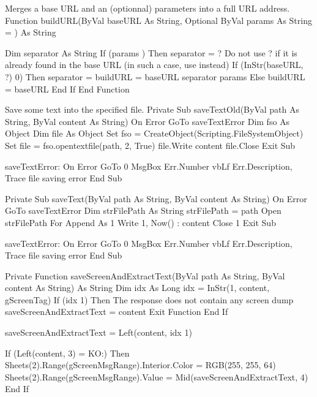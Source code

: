 \documentclass[letterpaper,10pt,english]{sphinxmanual}
\begin{document}
\begin{sphinxVerbatim}[commandchars=\\\{\}]
\PYGZsq{} Merges a base URL and an (optionnal) parameters into a full URL address.
\PYGZsq{}
Function buildURL(ByVal baseURL As String, Optional ByVal params As String = \PYGZdq{}\PYGZdq{}) As String

      Dim separator As String
      If (params \PYGZlt{}\PYGZgt{} \PYGZdq{}\PYGZdq{}) Then
            separator = \PYGZdq{}?\PYGZdq{}
      \PYGZsq{} Do not use \PYGZsq{}?\PYGZsq{} if it is already found in the base URL (in such a case, use \PYGZsq{}\PYGZam{}\PYGZsq{} instead)
      If (InStr(baseURL, \PYGZdq{}?\PYGZdq{}) \PYGZgt{} 0) Then separator = \PYGZdq{}\PYGZam{}\PYGZdq{}
            buildURL = baseURL \PYGZam{} separator \PYGZam{} params
      Else
            buildURL = baseURL
      End If
End Function

\PYGZsq{} Save some text into the specified file.
\PYGZsq{}
Private Sub saveTextOld(ByVal path As String, ByVal content As String)
      On Error GoTo saveTextError
      Dim fso As Object
      Dim file As Object
      Set fso = CreateObject(\PYGZdq{}Scripting.FileSystemObject\PYGZdq{})
      Set file = fso.opentextfile(path, 2, True)
      file.Write content
      file.Close
      Exit Sub

saveTextError:
      On Error GoTo 0
      MsgBox Err.Number \PYGZam{} vbLf \PYGZam{} Err.Description, \PYGZdq{}Trace file saving error\PYGZdq{}
End Sub

Private Sub saveText(ByVal path As String, ByVal content As String)
      On Error GoTo saveTextError
      Dim strFile\PYGZus{}Path As String
      strFile\PYGZus{}Path = path
      Open strFile\PYGZus{}Path For Append As \PYGZsh{}1
      Write \PYGZsh{}1, Now() \PYGZam{} \PYGZdq{} : \PYGZdq{} \PYGZam{} content
      Close \PYGZsh{}1
Exit Sub

saveTextError:
      On Error GoTo 0
      MsgBox Err.Number \PYGZam{} vbLf \PYGZam{} Err.Description, \PYGZdq{}Trace file saving error\PYGZdq{}
End Sub

Private Function saveScreenAndExtractText(ByVal path As String, ByVal content As String) As String
      Dim idx As Long
      idx = InStr(1, content, g\PYGZus{}ScreenTag)
      If (idx \PYGZlt{} 1) Then
      \PYGZsq{} The response does not contain any screen dump
            saveScreenAndExtractText = content
            Exit Function
      End If

      saveScreenAndExtractText = Left(content, idx \PYGZhy{} 1)

      If (Left(content, 3) = \PYGZdq{}KO:\PYGZdq{}) Then
            Sheets(2).Range(g\PYGZus{}ScreenMsgRange).Interior.Color = RGB(255, 255, 64)
            Sheets(2).Range(g\PYGZus{}ScreenMsgRange).Value = \PYGZdq{}  \PYGZdq{} \PYGZam{} Mid(saveScreenAndExtractText, 4)
      End If


\end{sphinxVerbatim}
\end{document}
